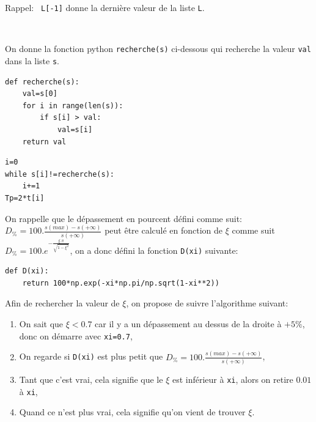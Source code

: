 Rappel: \verb? L[-1]? donne la dernière valeur de la liste \verb?L?.


~\

On donne la fonction python \verb?recherche(s)? ci-dessous qui recherche la valeur \verb?val? dans la liste \verb?s?.

\begin{center}
\begin{verbatim}
def recherche(s):
    val=s[0]
    for i in range(len(s)):
        if s[i] > val:
            val=s[i]
    return val
\end{verbatim}
\end{center}


\begin{center}
\begin{verbatim}
i=0
while s[i]!=recherche(s):
    i+=1
Tp=2*t[i]
\end{verbatim}
\end{center}

On rappelle que le dépassement en pourcent défini comme suit: $D_\%=100.\frac{s(max)-s(+\infty)}{s(+\infty)}$ peut être calculé en fonction de $\xi$ comme suit $D_\%=100.e^{-\frac{\xi.\pi}{\sqrt{1-\xi^2}}}$, on a donc défini la fonction \verb?D(xi)? suivante:

\begin{center}
\begin{verbatim}
def D(xi):
    return 100*np.exp(-xi*np.pi/np.sqrt(1-xi**2))
\end{verbatim}
\end{center}

Afin de rechercher la valeur de $\xi$, on propose de suivre l'algorithme suivant:
\begin{enumerate}
 \item On sait que $\xi<0.7$ car il y a un dépassement au dessus de la droite à $+5\%$, donc on démarre avec \verb?xi=0.7?,
 \item On regarde si \verb?D(xi)? est plus petit que $D_\%=100.\frac{s(max)-s(+\infty)}{s(+\infty)}$,
 \item Tant que c'est vrai, cela signifie que le $\xi$ est inférieur à \verb?xi?, alors on retire $0.01$ à \verb?xi?,
 \item Quand ce n'est plus vrai, cela signifie qu'on vient de trouver $\xi$.
\end{enumerate}

